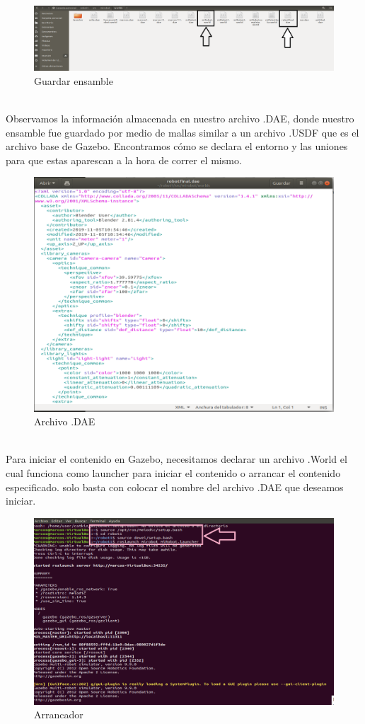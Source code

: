 \documentclass[11pt,a4paper,oldfontcommands,oneside]{memoir}
\begin{document}
\begin{figure}[h]
	\includegraphics[scale=.5]{carpeta.png}
	\caption{Guardar ensamble}
	\label{Imagen 5}
\end{figure}\\
Observamos la información almacenada en nuestro archivo .DAE, donde nuestro ensamble fue guardado por medio de mallas similar a un archivo .USDF que es el archivo base de Gazebo.
Encontramos cómo se declara el entorno y las uniones para que estas aparescan a la hora de correr el mismo.
\begin{figure}[h]
	\includegraphics[scale=.45]{dae.png}
	\caption{Archivo .DAE}
	\label{Imagen 6}
\end{figure}\\
Para iniciar el contenido en Gazebo, necesitamos declarar un archivo .World el cual funciona como launcher para iniciar el contenido o arrancar el contenido especificado. solo basta con colocar el nombre del archivo .DAE que deseamos iniciar.
\begin{figure}[h]
	\includegraphics[scale=.45]{6.png}
	\caption{Arrancador}
	\label{Imagen 7}
\end{figure}
\end{document}
